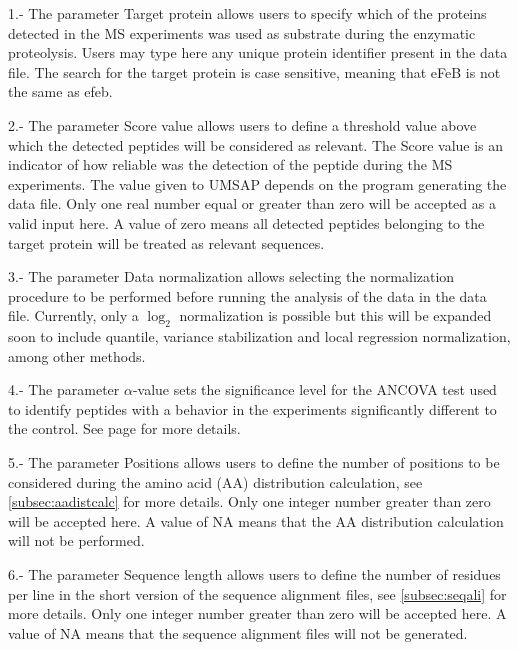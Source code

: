 \num{1}.- The parameter Target protein\label{par:subsprot} allows users to specify which of the proteins detected in the MS experiments was used as substrate during the enzymatic proteolysis. Users may type here any unique protein identifier present in the data file. The search for the target protein is case sensitive, meaning that eFeB is not the same as efeb.

\num{2}.- The parameter Score value\label{par:scorevalueenzdig} allows users to define a threshold value above which the detected peptides will be considered as relevant. The Score value is an indicator of how reliable was the detection of the peptide during the MS experiments. The value given to UMSAP depends on the program generating the data file. Only one real number equal or greater than zero will be accepted as a valid input here. A value of zero means all detected peptides belonging to the target protein will be treated as relevant sequences.

\num{3}.- The parameter Data normalization allows selecting the normalization procedure to be performed before running the analysis of the data in the data file. Currently, only a $\log_2$ normalization is possible but this will be expanded soon to include quantile, variance stabilization and local regression normalization, among other methods. 

\num{4}.- The parameter $\alpha$-value sets the significance level for the ANCOVA test used to identify peptides with a behavior in the experiments significantly different to the control. See page \pageref{par:ancovatest} for more details.

\num{5}.- The parameter Positions\label{par:enzdigPos} allows users to define the number of positions to be considered during the amino acid (AA) distribution calculation, see \autoref{subsec:aadistcalc} for more details. Only one integer number greater than zero will be accepted here. A value of NA means that the AA distribution calculation will not be performed. 

\num{6}.- The parameter Sequence length\label{par:enzdigSeqL} allows users to define the number of residues per line in the short version of the sequence alignment files, see \autoref{subsec:seqali} for more details. Only one integer number greater than zero will be accepted here. A value of NA means that the sequence alignment files will not be generated.

